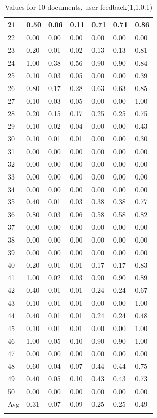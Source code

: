 \documentclass[12pt]{article}
\begin{document}
\begin{longtable}[c]{|l|l|l|l|l|l|l|}
  21 & 0.50 & 0.06 & 0.11 & 0.71 & 0.71 & 0.86 \\ \hline
  22 & 0.00 & 0.00 & 0.00 & 0.00 & 0.00 & 0.00 \\ \hline
  23 & 0.20 & 0.01 & 0.02 & 0.13 & 0.13 & 0.81 \\ \hline
  24 & 1.00 & 0.38 & 0.56 & 0.90 & 0.90 & 0.84 \\ \hline
  25 & 0.10 & 0.03 & 0.05 & 0.00 & 0.00 & 0.39 \\ \hline
  26 & 0.80 & 0.17 & 0.28 & 0.63 & 0.63 & 0.85 \\ \hline
  27 & 0.10 & 0.03 & 0.05 & 0.00 & 0.00 & 1.00 \\ \hline
  28 & 0.20 & 0.15 & 0.17 & 0.25 & 0.25 & 0.75 \\ \hline
  29 & 0.10 & 0.02 & 0.04 & 0.00 & 0.00 & 0.43 \\ \hline
  30 & 0.10 & 0.01 & 0.01 & 0.00 & 0.00 & 0.30 \\ \hline
  31 & 0.00 & 0.00 & 0.00 & 0.00 & 0.00 & 0.00 \\ \hline
  32 & 0.00 & 0.00 & 0.00 & 0.00 & 0.00 & 0.00 \\ \hline
  33 & 0.00 & 0.00 & 0.00 & 0.00 & 0.00 & 0.00 \\ \hline
  34 & 0.00 & 0.00 & 0.00 & 0.00 & 0.00 & 0.00 \\ \hline
  35 & 0.40 & 0.01 & 0.03 & 0.38 & 0.38 & 0.77 \\ \hline
  36 & 0.80 & 0.03 & 0.06 & 0.58 & 0.58 & 0.82 \\ \hline
  37 & 0.00 & 0.00 & 0.00 & 0.00 & 0.00 & 0.00 \\ \hline
  38 & 0.00 & 0.00 & 0.00 & 0.00 & 0.00 & 0.00 \\ \hline
  39 & 0.00 & 0.00 & 0.00 & 0.00 & 0.00 & 0.00 \\ \hline
  40 & 0.20 & 0.01 & 0.01 & 0.17 & 0.17 & 0.83 \\ \hline
  41 & 1.00 & 0.02 & 0.03 & 0.90 & 0.90 & 0.89 \\ \hline
  42 & 0.40 & 0.01 & 0.01 & 0.24 & 0.24 & 0.67 \\ \hline
  43 & 0.10 & 0.01 & 0.01 & 0.00 & 0.00 & 1.00 \\ \hline
  44 & 0.40 & 0.01 & 0.01 & 0.24 & 0.24 & 0.48 \\ \hline
  45 & 0.10 & 0.01 & 0.01 & 0.00 & 0.00 & 1.00 \\ \hline
  46 & 1.00 & 0.05 & 0.10 & 0.90 & 0.90 & 1.00 \\ \hline
  47 & 0.00 & 0.00 & 0.00 & 0.00 & 0.00 & 0.00 \\ \hline
  48 & 0.60 & 0.04 & 0.07 & 0.44 & 0.44 & 0.75 \\ \hline
  49 & 0.40 & 0.05 & 0.10 & 0.43 & 0.43 & 0.73 \\ \hline
  50 & 0.00 & 0.00 & 0.00 & 0.00 & 0.00 & 0.00 \\ \hline
  Avg & 0.31 & 0.07 & 0.09 & 0.25 & 0.25 & 0.49 \\ \hline
  \caption{Values for 10 documents, user feedback(1,1,0.1)}
  \label{tab:tab1}\\
  \end{longtable}
\end{document}
